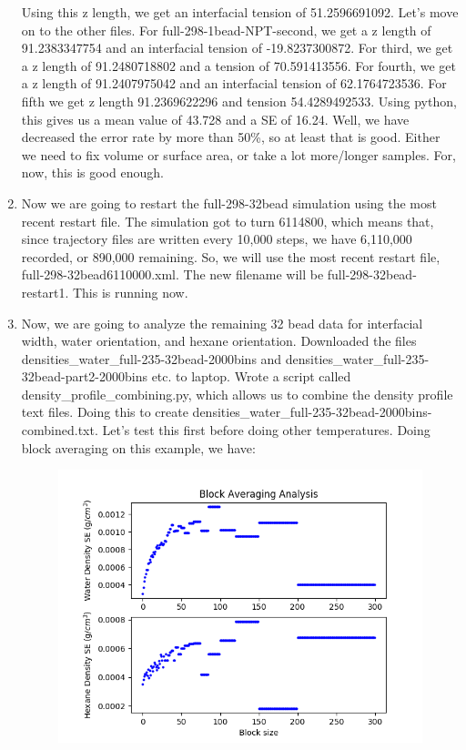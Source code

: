 \documentclass[12pt,reqno]{amsart}
\numberwithin{equation}{section}
\begin{document}
\begin{enumerate}
Using this z length, we get an interfacial tension of 51.2596691092.  Let's move on to the other files.  For full-298-1bead-NPT-second, we get a z length of 91.2383347754 and an interfacial tension of -19.8237300872.  For third, we get a z length of 91.2480718802 and a tension of 70.591413556.  For fourth, we get a z length of 91.2407975042 and an interfacial tension of 62.1764723536.  For fifth we get z length 91.2369622296 and tension 54.4289492533.  Using python, this gives us a mean value of 43.728 and a SE of 16.24.  Well, we have decreased the error rate by more than 50\%, so at least that is good.  Either we need to fix volume or surface area, or take a lot more/longer samples.  For, now, this is good enough.   
\item Now we are going to restart the full-298-32bead simulation using the most recent restart file.  The simulation got to turn 6114800, which means that, since trajectory files are written every 10,000 steps, we have 6,110,000 recorded, or 890,000 remaining.  So, we will use the most recent restart file, full-298-32bead6110000.xml.  The new filename will be full-298-32bead-restart1.  This is running now.  
\item Now, we are going to analyze the remaining 32 bead data for interfacial width, water orientation, and hexane orientation.  Downloaded the files densities\_water\_full-235-32bead-2000bins and densities\_water\_full-235-32bead-part2-2000bins etc. to laptop.  Wrote a script called density\_profile\_combining.py, which allows us to combine the density profile text files.  Doing this to create densities\_water\_full-235-32bead-2000bins-combined.txt.  Let's test this first before doing other temperatures.  Doing block averaging on this example, we have:

\begin{figure}[H]
\centering
\includegraphics[scale=0.6]{density_profile_block_averaging_1_full-235-32bead-2000bins-combined}
\end{figure}


\end{enumerate}
\end{document}
